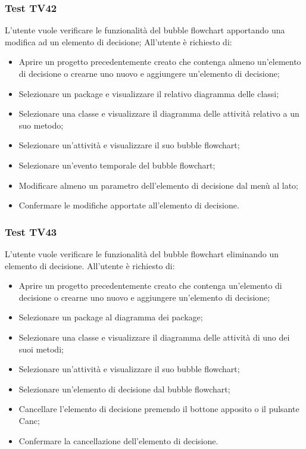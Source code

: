 \documentclass[../PianoDiQualifica.tex]{subfiles}
\begin{document}
	\subsubsection{Test TV42} 
	L'utente vuole verificare le funzionalità del bubble flowchart apportando una modifica ad un elemento di decisione;
	All'utente è richiesto di: 
	\begin{itemize} 
		\item Aprire un progetto precedentemente creato che contenga almeno un'elemento di decisione o crearne uno nuovo e aggiungere un'elemento di decisione;
		\item Selezionare un package e visualizzare il relativo diagramma delle classi; 
		\item Selezionare una classe e visualizzare il diagramma delle attività relativo a un suo metodo; 
		\item Selezionare un'attività e visualizzare il suo bubble flowchart; 
		\item Selezionare un'evento temporale del bubble flowchart; 
		\item Modificare almeno un parametro dell'elemento di decisione dal menù al lato; 
		\item Confermare le modifiche apportate all'elemento di decisione. 
	\end{itemize} 
	
	
	\subsubsection{Test TV43} 
	L'utente vuole verificare le funzionalità del bubble flowchart eliminando un elemento di decisione. 
	All'utente è richiesto di: 
	\begin{itemize} 
		\item Aprire un progetto precedentemente creato che contenga un'elemento di decisione o crearne uno nuovo e aggiungere un'elemento di decisione;
		\item Selezionare un package al diagramma dei package; 
		\item Selezionare una classe e visualizzare il diagramma delle attività di uno dei suoi metodi; 
		\item Selezionare un'attività e visualizzare il suo bubble flowchart; 
		\item Selezionare un'elemento di decisione dal bubble flowchart; 
		\item Cancellare l'elemento di decisione premendo il bottone apposito o il pulsante Canc; 
		\item Confermare la cancellazione dell'elemento di decisione.
	\end{itemize} 
	
\end{document}
